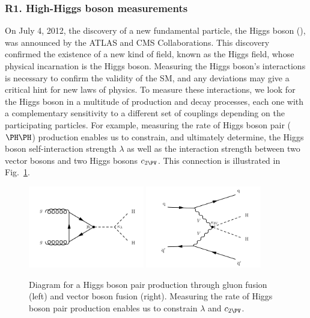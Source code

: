 \documentclass[11pt,letterpaper,notitlepage]{article}
\begin{document}
\vspace{-1ex}
\subsubsection*{R1. High-\pt Higgs boson measurements}

On July 4, 2012, the discovery of a new fundamental particle, the Higgs boson (\PH), was announced by the ATLAS and CMS Collaborations.
This discovery confirmed the existence of a new kind of field, known as the Higgs field, whose physical incarnation is the Higgs boson.
Measuring the Higgs boson's interactions is necessary to confirm the validity of the SM, and any deviations may give a critical hint for new laws of physics.
To measure these interactions, we look for the Higgs boson in a multitude of production and decay processes, each one with a complementary sensitivity to a different set of couplings depending on the participating particles.
For example, measuring the rate of Higgs boson pair ($\PH\PH$) production enables us to constrain, and ultimately determine, the Higgs boson self-interaction strength $\lambda$ as well as the interaction strength between two vector bosons and two Higgs bosons $c_{2\PV}$.
This connection is illustrated in Fig.~\ref{fig:higgs}.

\begin{figure}[htb]
    \centering
    \includegraphics[width=0.45\textwidth]{CMS-PAS-HIG-23-012_Figure_001-a.pdf}
    \includegraphics[width=0.45\textwidth]{CMS-PAS-HIG-23-012_Figure_001-e.pdf}
    \caption{
        Diagram for a Higgs boson pair production through gluon fusion (left) and vector boson fusion (right).
        Measuring the rate of Higgs boson pair production enables us to constrain $\lambda$ and $c_{2\PV}$.
        \label{fig:higgs}}
\end{figure}
\end{document}
